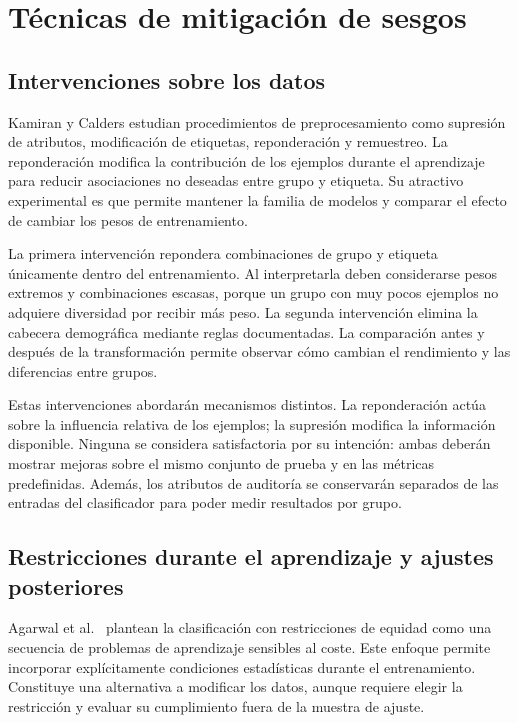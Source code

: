 \documentclass[11pt,a4paper,oneside]{report}
\begin{document}
\section{Técnicas de mitigación de sesgos}

\subsection{Intervenciones sobre los datos}

Kamiran y Calders \cite{kamiran2012} estudian procedimientos de preprocesamiento como supresión de atributos, modificación de etiquetas, reponderación y remuestreo. La reponderación modifica la contribución de los ejemplos durante el aprendizaje para reducir asociaciones no deseadas entre grupo y etiqueta. Su atractivo experimental es que permite mantener la familia de modelos y comparar el efecto de cambiar los pesos de entrenamiento.

La primera intervención repondera combinaciones de grupo y etiqueta únicamente dentro del entrenamiento. Al interpretarla deben considerarse pesos extremos y combinaciones escasas, porque un grupo con muy pocos ejemplos no adquiere diversidad por recibir más peso. La segunda intervención elimina la cabecera demográfica mediante reglas documentadas. La comparación antes y después de la transformación permite observar cómo cambian el rendimiento y las diferencias entre grupos.

Estas intervenciones abordarán mecanismos distintos. La reponderación actúa sobre la influencia relativa de los ejemplos; la supresión modifica la información disponible. Ninguna se considera satisfactoria por su intención: ambas deberán mostrar mejoras sobre el mismo conjunto de prueba y en las métricas predefinidas. Además, los atributos de auditoría se conservarán separados de las entradas del clasificador para poder medir resultados por grupo.

\subsection{Restricciones durante el aprendizaje y ajustes posteriores}

Agarwal et al.\ \cite{agarwal2018} plantean la clasificación con restricciones de equidad como una secuencia de problemas de aprendizaje sensibles al coste. Este enfoque permite incorporar explícitamente condiciones estadísticas durante el entrenamiento. Constituye una alternativa a modificar los datos, aunque requiere elegir la restricción y evaluar su cumplimiento fuera de la muestra de ajuste.
\end{document}
